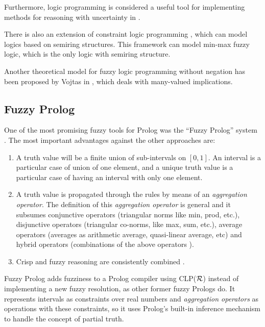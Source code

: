 \documentclass[runningheads,a4paper]{llncs}
\begin{document}
Furthermore, logic programming is considered a useful tool for
implementing methods for reasoning with uncertainty in
\cite{Shapiro83}.

There is also an extension of constraint logic programming
\cite{Bistarelli01}, which can model logics based on semiring
structures. This framework can model min-max fuzzy logic, which is the
only logic with semiring structure.


Another theoretical model for fuzzy logic programming without negation
has been proposed by Vojtas in \cite{Vojt1}, which deals with
many-valued implications.

\subsection{Fuzzy Prolog}
\label{subsec:fuzzy-prolog}


One of the most promising fuzzy tools for Prolog was the ``Fuzzy
Prolog'' system
\cite{Vaucheret_LPAR02,Susana_FSS04}. 
The most important advantages against the other approaches are:
\begin{enumerate}

\item A truth value will be a finite union of sub-intervals on
  $[0,1]$. An interval is a particular case of union of one element,
  and a unique truth value is a particular case of having an interval
  with only one element.

\item A truth value is propagated through the rules by means of
  an \emph{aggregation operator}. The definition of this 
  \emph{aggregation operator} is general and 
  it subsumes conjunctive operators (triangular
  norms \cite{Norms00} like min, prod, etc.), disjunctive operators
  \cite{Tri_Cub_Cas} (triangular co-norms, like max, sum, etc.),
  average operators (averages as arithmetic average, quasi-linear
  average, etc) and hybrid operators (combinations of the above
  operators \cite{Prad_Tri_Cal}). 

\item Crisp and fuzzy reasoning are consistently combined 
  \cite{Susana_fuzzyneg_AGP02}.
\end{enumerate}

Fuzzy Prolog adds fuzziness to a Prolog compiler using CLP(${\cal R}$)
instead of implementing a new fuzzy resolution, as other former fuzzy
Prologs do. 
It represents intervals as constraints over real numbers and 
\emph{aggregation operators} as operations with these constraints,
so it uses Prolog's built-in inference mechanism 
to handle the concept of partial truth. 
\end{document}
